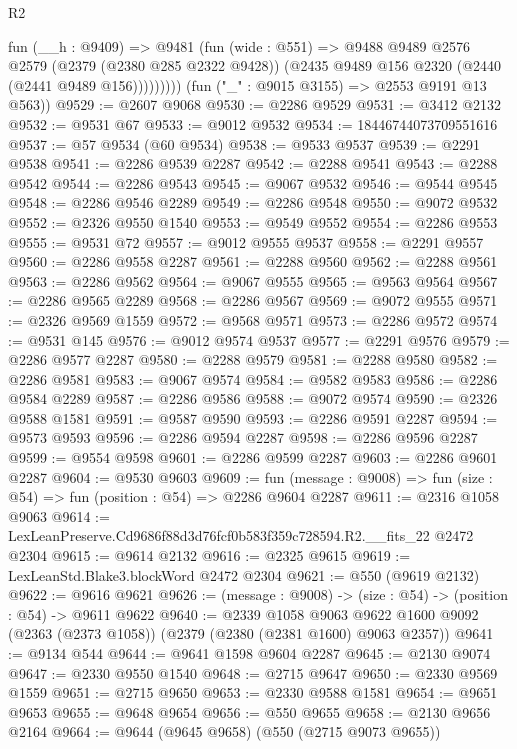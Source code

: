 \begin{lexlean}{R2}
\begin{coremodule}
              fun (__h : @9409) =>
              @9481
                (fun (wide : @551) =>
                @9488
                  @9489
                  @2576
                  @2579
                  (@2379 (@2380 @285 @2322 @9428))
                  (@2435 @9489 @156 @2320 (@2440 (@2441 @9489 @156)))))))))
      (fun ("_" : @9015 @3155) => @2553 @9191 @13 @563))
@9529 := @2607 @9068
@9530 := @2286 @9529
@9531 := @3412 @2132
@9532 := @9531 @67
@9533 := @9012 @9532
@9534 := 18446744073709551616
@9537 := @57 @9534 (@60 @9534)
@9538 := @9533 @9537
@9539 := @2291 @9538
@9541 := @2286 @9539 @2287
@9542 := @2288 @9541
@9543 := @2288 @9542
@9544 := @2286 @9543
@9545 := @9067 @9532
@9546 := @9544 @9545
@9548 := @2286 @9546 @2289
@9549 := @2286 @9548
@9550 := @9072 @9532
@9552 := @2326 @9550 @1540
@9553 := @9549 @9552
@9554 := @2286 @9553
@9555 := @9531 @72
@9557 := @9012 @9555 @9537
@9558 := @2291 @9557
@9560 := @2286 @9558 @2287
@9561 := @2288 @9560
@9562 := @2288 @9561
@9563 := @2286 @9562
@9564 := @9067 @9555
@9565 := @9563 @9564
@9567 := @2286 @9565 @2289
@9568 := @2286 @9567
@9569 := @9072 @9555
@9571 := @2326 @9569 @1559
@9572 := @9568 @9571
@9573 := @2286 @9572
@9574 := @9531 @145
@9576 := @9012 @9574 @9537
@9577 := @2291 @9576
@9579 := @2286 @9577 @2287
@9580 := @2288 @9579
@9581 := @2288 @9580
@9582 := @2286 @9581
@9583 := @9067 @9574
@9584 := @9582 @9583
@9586 := @2286 @9584 @2289
@9587 := @2286 @9586
@9588 := @9072 @9574
@9590 := @2326 @9588 @1581
@9591 := @9587 @9590
@9593 := @2286 @9591 @2287
@9594 := @9573 @9593
@9596 := @2286 @9594 @2287
@9598 := @2286 @9596 @2287
@9599 := @9554 @9598
@9601 := @2286 @9599 @2287
@9603 := @2286 @9601 @2287
@9604 := @9530 @9603
@9609 := fun (message : @9008) => fun (size : @54) => fun (position : @54) => @2286 @9604 @2287
@9611 := @2316 @1058 @9063
@9614 := LexLeanPreserve.Cd9686f88d3d76fcf0b583f359c728594.R2.__fits_22 @2472 @2304
@9615 := @9614 @2132
@9616 := @2325 @9615
@9619 := LexLeanStd.Blake3.blockWord @2472 @2304
@9621 := @550 (@9619 @2132)
@9622 := @9616 @9621
@9626 := (message : @9008) -> (size : @54) -> (position : @54) -> @9611 @9622
@9640 := @2339
    @1058
    @9063
    @9622
    @1600
    @9092
    (@2363 (@2373 @1058))
    (@2379 (@2380 (@2381 @1600) @9063 @2357))
@9641 := @9134 @544
@9644 := @9641 @1598 @9604 @2287
@9645 := @2130 @9074
@9647 := @2330 @9550 @1540
@9648 := @2715 @9647
@9650 := @2330 @9569 @1559
@9651 := @2715 @9650
@9653 := @2330 @9588 @1581
@9654 := @9651 @9653
@9655 := @9648 @9654
@9656 := @550 @9655
@9658 := @2130 @9656 @2164
@9664 := @9644 (@9645 @9658) (@550 (@2715 @9073 @9655))

\end{coremodule}
\end{lexlean}
